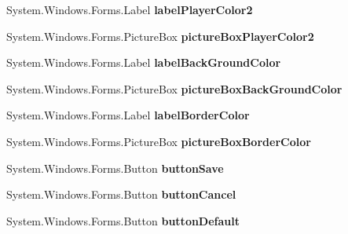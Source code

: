 \begin{DoxyCompactItemize}
\mbox{\label{class_reversi4color_form_1_1_setting_form_a3df1204bb92ba20201e9f71ac7416c7e}} 
System.\+Windows.\+Forms.\+Label {\bfseries label\+Player\+Color2}
\item 
\mbox{\label{class_reversi4color_form_1_1_setting_form_a73b42b69b563eecbb43bfc84ca58b1ef}} 
System.\+Windows.\+Forms.\+Picture\+Box {\bfseries picture\+Box\+Player\+Color2}
\item 
\mbox{\label{class_reversi4color_form_1_1_setting_form_a34f257868dbfa5f1ebbbb5b64f000586}} 
System.\+Windows.\+Forms.\+Label {\bfseries label\+Back\+Ground\+Color}
\item 
\mbox{\label{class_reversi4color_form_1_1_setting_form_a8b22febd966e43f541b454318cf3e350}} 
System.\+Windows.\+Forms.\+Picture\+Box {\bfseries picture\+Box\+Back\+Ground\+Color}
\item 
\mbox{\label{class_reversi4color_form_1_1_setting_form_a7b1def485a7bb67637ddf87761ccb5a8}} 
System.\+Windows.\+Forms.\+Label {\bfseries label\+Border\+Color}
\item 
\mbox{\label{class_reversi4color_form_1_1_setting_form_a6ac46ad249eb7f884d5c1d3c053e1021}} 
System.\+Windows.\+Forms.\+Picture\+Box {\bfseries picture\+Box\+Border\+Color}
\item 
\mbox{\label{class_reversi4color_form_1_1_setting_form_a1df7dedf719d6fe8cc15530d6d2ad3c8}} 
System.\+Windows.\+Forms.\+Button {\bfseries button\+Save}
\item 
\mbox{\label{class_reversi4color_form_1_1_setting_form_a14731f982849fe9483a98bca5d4f2088}} 
System.\+Windows.\+Forms.\+Button {\bfseries button\+Cancel}
\item 
\mbox{\label{class_reversi4color_form_1_1_setting_form_a741c33d9cdd89f4110d7ac28c60ef867}} 
System.\+Windows.\+Forms.\+Button {\bfseries button\+Default}

\end{DoxyCompactItemize}
